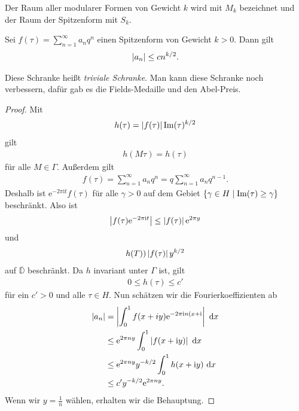 Der Raum aller modularer Formen von Gewicht $k$ wird mit $M_k$
bezeichnet und der Raum der Spitzenform mit $S_k$.
\begin{thm}[Hecke]
Sei $f(\tau)=\sum_{n=1}^\infty a_n q^n$ einen Spitzenform von
Gewicht $k>0$.
Dann gilt
\begin{align*}
\left\vert a_n\right\vert \leq c n^{k/2}.
\end{align*}
\end{thm}
Diese Schranke heißt \emph{triviale Schranke}. Man kann diese Schranke noch verbessern, dafür gab es die Fields-Medaille und den Abel-Preis.
\begin{proof}
Mit
\begin{align*}
h(\tau)=\left\vert f(\tau)\right\vert \operatorname{Im}(\tau)^{k/2}
\end{align*}
gilt
\begin{align*}
h(M\tau)=h(\tau)
\end{align*}
für alle $M \in \Gamma$.
Außerdem gilt
\begin{align*}
f(\tau)=\sum_{n=1}^\infty a_n q^n=q\sum_{n=1}^\infty a_n q^{n-1}.
\end{align*}
Deshalb ist $\mathrm{e}^{-2\pi \mathrm{i}t} f(\tau)$ für alle $\gamma>0$ auf
dem Gebiet $\{\gamma \in H \mid \operatorname{Im}(\tau)\geq \gamma\}$ beschränkt.
Also ist
\begin{align*}
\left\vert f(\tau) \mathrm{e}^{-2\pi \mathrm{i}t}\right\vert \leq \left\vert f(\tau)\right\vert \mathrm{e}^{2\pi y}
\end{align*}
und
\begin{align*}
h(T))\left\vert f(\tau)\right\vert y^{k/2}
\end{align*}
auf $\overline{\mathbb{D}}$ beschränkt.
Da $h$ invariant unter $\Gamma$ ist, gilt
\begin{align*}
0 \leq h(\tau)\leq c'
\end{align*}
für ein $c'>0$ und alle $\tau \in H$.
Nun schätzen wir die Fourierkoeffizienten ab
\begin{align*}
\left\vert a_n\right\vert&=\left\vert\int_0^1 f(x+iy) \mathrm{e}^{-2\pi \mathrm{i} n(x+\mathrm{i}}\right\vert ~\mathrm{d}x\\
&\leq \mathrm{e}^{2\pi ny} \int_0^1 \left\vert f(x+\mathrm{i}y)\right\vert~\mathrm{d}x\\
&\leq \mathrm{e}^{2\pi ny} y^{-k/2} \int_0^1 h(x+\mathrm{i}y)~\mathrm{d}x\\
&\leq c' y^{-k/2} \mathrm{e}^{2\pi ny}.
\end{align*}
Wenn wir $y=\frac{1}{n}$ wählen, erhalten wir die Behauptung.
\end{proof}

